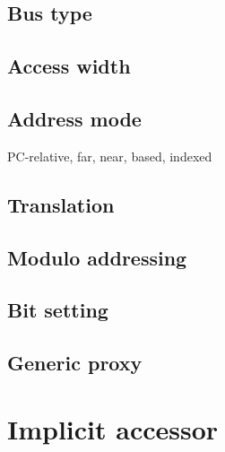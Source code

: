 \documentclass{article}
\begin{document}
\subsection{Bus type}
\label{sec:bus-type}

\subsection{Access width}
\label{sec:access-width}

\subsection{Address mode}
\label{sec:address-mode}

PC-relative, far, near, based, indexed

\subsection{Translation}
\label{sec:translation}

\subsection{Modulo addressing}
\label{sec:modulo-addressing}

\subsection{Bit setting}
\label{sec:bit-setting}

\subsection{Generic proxy}
\label{sec:generic-proxy}


\section{Implicit accessor}
\label{sec:implicit-accessor}
\end{document}
